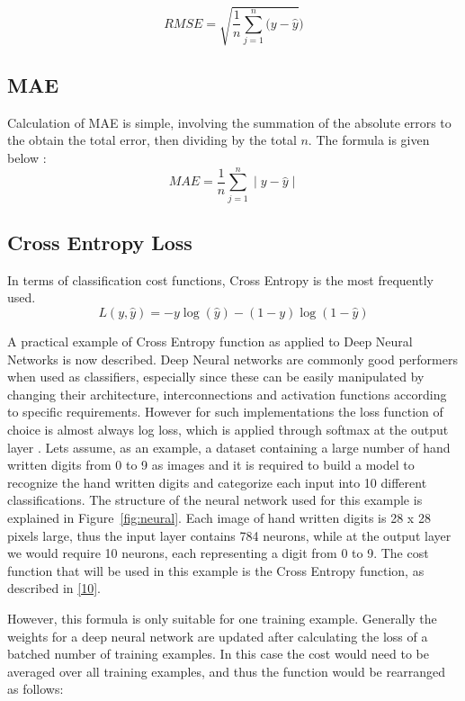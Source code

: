 \begin{equation}
RMSE = \sqrt{\frac{1}{n}\sum_{j=1}^{n}(y-\hat{y}})
\end{equation}

\subsection{MAE}

Calculation of MAE is simple, involving the summation of the absolute errors to the obtain the total error, then dividing by the total $n$. The formula is given below :
\begin{equation}
MAE = {\frac{1}{n}\sum_{j=1}^{n}\mid{y}-\hat{y}}\mid{}
\end{equation}

\subsection{Cross Entropy Loss}

In terms of classification cost functions,  Cross Entropy is the most frequently used.
\begin{equation}
\label{10}
L(y, \hat{y}) = -y \log(\hat{y}) - (1-y) \log(1-\hat{y})
\end{equation}

A practical example of Cross Entropy function as applied to Deep Neural Networks is now described.  Deep Neural networks are commonly good performers when used as classifiers, especially since these can be easily manipulated by changing their architecture, interconnections and activation functions according to specific requirements. However for such implementations the loss function of choice is almost always log loss, which is applied through softmax at the output layer \citep {DBLP:journals/corr/JanochaC17}. Lets assume, as an example, a dataset containing a large number of hand written digits from 0 to 9 as images and it is required to build a model  to recognize the hand written digits and categorize each input into 10 different classifications. The structure of the neural network used for this example is explained in Figure~\ref{fig:neural}. Each image of hand written digits is 28 x 28 pixels large, thus the input layer contains 784 neurons, while at the output layer we would require 10 neurons, each representing a digit from 0 to 9. The cost function that will be used in this example is the Cross Entropy function, as described in \ref{10}.

However, this formula is only suitable for one training example. Generally the weights for a deep neural network are updated after calculating the loss of a batched number of training examples. In this case the cost would need to be averaged over all training examples, and thus the function would be rearranged as follows:

